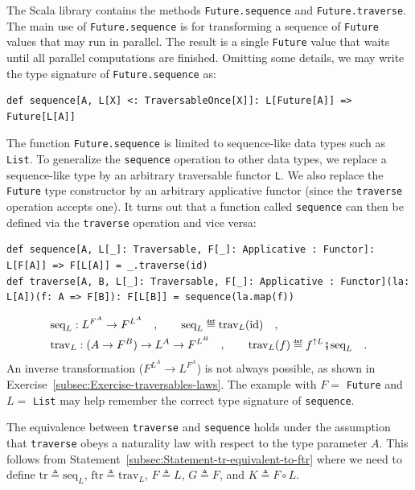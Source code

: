 The Scala library contains the methods \lstinline!Future.sequence!
and \lstinline!Future.traverse!. The main use of \lstinline!Future.sequence!
is for transforming a sequence of \lstinline!Future! values that
may run in parallel. The result is a single \lstinline!Future! value
that waits until all parallel computations are finished. Omitting
some details, we may write the type signature of \lstinline!Future.sequence!
as:
\begin{lstlisting}
def sequence[A, L[X] <: TraversableOnce[X]]: L[Future[A]] => Future[L[A]]
\end{lstlisting}

The function \lstinline!Future.sequence! is limited to sequence-like
data types such as \lstinline!List!. To generalize the \lstinline!sequence!
operation to other data types, we replace a sequence-like type by
an arbitrary traversable functor \lstinline!L!. We also replace the
\lstinline!Future! type constructor by an arbitrary applicative functor
(since the \lstinline!traverse! operation accepts one). It turns
out that a function called \lstinline!sequence! can then be defined
via the \lstinline!traverse! operation and vice versa:
\begin{lstlisting}
def sequence[A, L[_]: Traversable, F[_]: Applicative : Functor]: L[F[A]] => F[L[A]] = _.traverse(id)
def traverse[A, B, L[_]: Traversable, F[_]: Applicative : Functor](la: L[A])(f: A => F[B]): F[L[B]] = sequence(la.map(f))
\end{lstlisting}
\begin{align*}
 & \text{seq}_{L}:L^{F^{A}}\rightarrow F^{L^{A}}\quad,\quad\quad\text{seq}_{L}\triangleq\text{trav}_{L}(\text{id})\quad,\\
 & \text{trav}_{L}:(A\rightarrow F^{B})\rightarrow L^{A}\rightarrow F^{L^{B}}\quad,\quad\quad\text{trav}_{L}(f)\triangleq f^{\uparrow L}\bef\text{seq}_{L}\quad.
\end{align*}
An inverse transformation ($F^{L^{A}}\rightarrow L^{F^{A}}$) is not
always possible, as shown in Exercise~\ref{subsec:Exercise-traversables-laws}.
The example with $F=$ \lstinline!Future! and $L=$ \lstinline!List!
may help remember the correct type signature of \lstinline!sequence!.

The equivalence between \lstinline!traverse! and \lstinline!sequence!
holds under the assumption that \lstinline!traverse! obeys a naturality
law with respect to the type parameter $A$. This follows from Statement~\ref{subsec:Statement-tr-equivalent-to-ftr}
where we need to define $\text{tr}\triangleq\text{seq}_{L}$, $\text{ftr}\triangleq\text{trav}_{L}$,
$F\triangleq L$, $G\triangleq F$, and $K\triangleq F\circ L$. 


